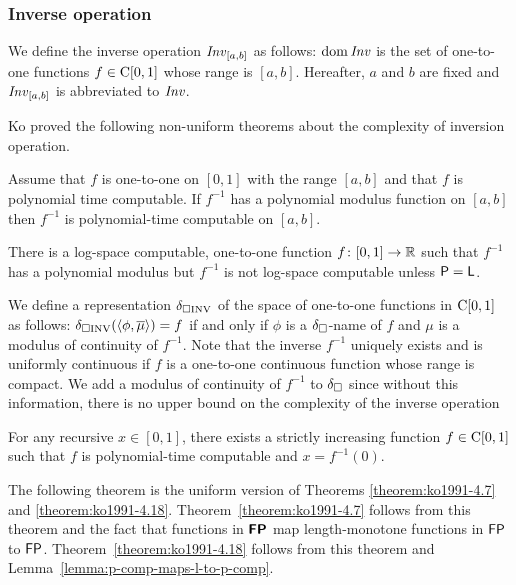 \documentclass[envcountsame,orivec,oribibl]{llncs}
\begin{document}
\subsubsection{Inverse operation}

We define the inverse operation $\mathit{Inv}_{[a,b]}$ as follows:
$\mathop{\rm dom} \mathit{Inv}$ is the set of one-to-one functions $f \in \mathrm C[0,1]$
whose range is $[a,b]$.
Hereafter, $a$ and $b$ are fixed and $\mathit{Inv}_{[a,b]}$ is abbreviated to $\mathit{Inv}$.

Ko proved the following non-uniform theorems about the complexity of 
inversion operation.
\begin{theorem}
\label{theorem:ko1991-4.7}
Assume that $f$ is one-to-one on $[0,1]$ with the range $[a, b]$ and that 
$f$ is polynomial time computable. 
If $f^{-1}$ has a polynomial modulus function on $[a,b]$ then
$f^{-1}$ is polynomial-time computable on $[a, b]$.
\end{theorem}
\begin{theorem}
\label{theorem:ko1991-4.18}
There is a log-space computable, one-to-one function $f \colon [0, 1] \to \mathbb R$
such that $f^{-1}$ has a polynomial modulus 
but $f^{-1}$ is not log-space computable
unless $\mathsf{P} = \mathsf{L}$.
\end{theorem}

We define a representation $\delta _{\square \mathrm{INV}}$ of the space of 
one-to-one functions in $\mathrm C[0,1]$ as follows:
$\delta _{\square \mathrm{INV}}(\langle \phi, \overline{\mu} \rangle) = f$ 
if and only if $\phi$ is a $\delta _\square$-name of $f$ 
and $\mu$ is a modulus of continuity of $f^{-1}$.
Note that the inverse $f^{-1}$ uniquely exists and is uniformly continuous
if $f$ is a one-to-one continuous function whose range is compact.
We add a modulus of continuity of $f^{-1}$ to $\delta _\square$
since without this information, there is no upper bound on 
the complexity of the inverse operation 
\begin{theorem}
For any recursive $x \in [0, 1]$, 
there exists a strictly increasing function $f \in \mathrm C[0, 1]$ 
such that $f$ is polynomial-time computable and $x = f^{-1}(0)$.
\end{theorem}

The following theorem is the uniform version of Theorems 
\ref{theorem:ko1991-4.7} and 
\ref{theorem:ko1991-4.18}.
Theorem~\ref{theorem:ko1991-4.7} follows from this theorem and the fact that
functions in $\text{\bfseries \sffamily \upshape FP}$ map length-monotone functions in $\mathsf{FP}$ to $\mathsf{FP}$.
Theorem~\ref{theorem:ko1991-4.18} follows from this theorem and Lemma~\ref{lemma:p-comp-maps-l-to-p-comp}.
\end{document}
